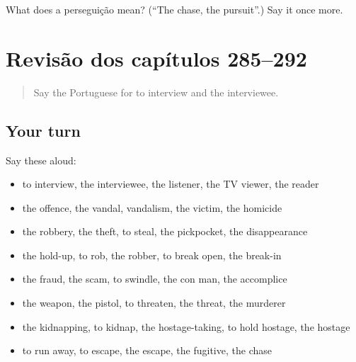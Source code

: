 \begin{tcolorbox}[breakable,colback=teal!4,colframe=teal!35!black,title={Before you move on}]
What does a perseguição mean? (\textquotedblleft{}The chase, the pursuit\textquotedblright{}.) Say it once more.
\end{tcolorbox}
\section[(dialogue)]{Revisão dos capítulos 285–292}

\label{lesson:PT-R292-revisao-285-292}



\begin{quote}
Say the Portuguese for to interview and the interviewee.
\end{quote}

\subsection*{Your turn}
Say these aloud:

\begin{itemize}
\raggedright
  \item to interview, the interviewee, the listener, the TV viewer, the reader
  \item the offence, the vandal, vandalism, the victim, the homicide
  \item the robbery, the theft, to steal, the pickpocket, the disappearance
  \item the hold-up, to rob, the robber, to break open, the break-in
  \item the fraud, the scam, to swindle, the con man, the accomplice
  \item the weapon, the pistol, to threaten, the threat, the murderer
  \item the kidnapping, to kidnap, the hostage-taking, to hold hostage, the hostage
  \item to run away, to escape, the escape, the fugitive, the chase
\end{itemize}

